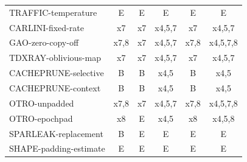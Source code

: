 \begin{table}[ht]
\begin{tabular}{@{}lccccc@{}}
TRAFFIC-temperature & E & E & E & E & E\\
CARLINI-fixed-rate & x7 & x7 & x4,5,7 & x7 & x4,5,7\\
GAO-zero-copy-off & x7,8 & x7 & x4,5,7 & x7,8 & x4,5,7,8\\
TDXRAY-oblivious-map & x7 & x7 & x4,5,7 & x7 & x4,5,7\\
CACHEPRUNE-selective & B & B & x4,5 & B & x4,5\\
CACHEPRUNE-context & B & B & x4,5 & B & x4,5\\
OTRO-unpadded & x7,8 & x7 & x4,5,7 & x7,8 & x4,5,7,8\\
OTRO-epochpad & x8 & E & x4,5 & x8 & x4,5,8\\
SPARLEAK-replacement & B & E & E & E & E\\
SHAPE-padding-estimate & E & E & E & E & E\\
\bottomrule\end{tabular}\end{table}

